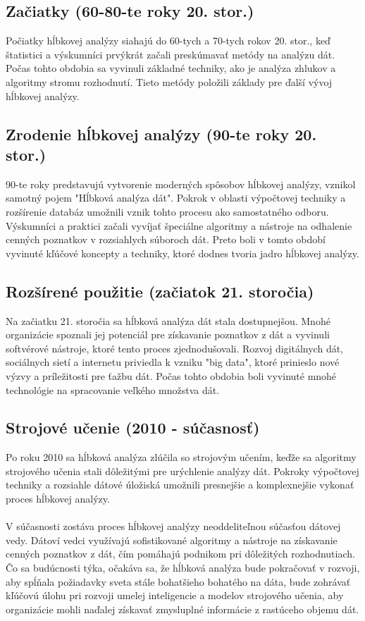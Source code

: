 \documentclass[10pt,twoside,slovak,a4paper]{article}
\begin{document}
\subsection{Začiatky (60-80-te roky 20. stor.)} 
Počiatky hĺbkovej analýzy siahajú do 60-tych a 70-tych rokov 20. stor., keď štatistici a výskumníci prvýkrát začali preskúmavať metódy na analýzu dát.
Počas tohto obdobia sa vyvinuli základné techniky, ako je analýza zhlukov a algoritmy stromu rozhodnutí. Tieto metódy položili základy pre ďalší vývoj hĺbkovej analýzy.

\subsection{Zrodenie hĺbkovej analýzy (90-te roky 20. stor.)} 
90-te roky predstavujú vytvorenie moderných spôsobov hĺbkovej analýzy, vznikol samotný pojem "Hĺbková analýza dát". Pokrok v oblasti výpočtovej techniky a rozšírenie databáz umožnili vznik tohto procesu ako samostatného odboru. Výskumníci a praktici začali vyvíjať špeciálne algoritmy a nástroje na odhalenie cenných poznatkov v rozsiahlych súboroch dát. Preto boli v tomto období vyvinuté kľúčové koncepty a techniky, ktoré dodnes tvoria jadro hĺbkovej analýzy.

\subsection{Rozšírené použitie (začiatok 21. storočia)} 
Na začiatku 21. storočia sa hĺbková analýza dát stala dostupnejšou. Mnohé organizácie spoznali jej potenciál pre získavanie poznatkov z dát a vyvinuli softvérové nástroje, ktoré tento proces zjednodušovali. Rozvoj digitálnych dát, sociálnych sietí a internetu priviedla k vzniku "big data", ktoré prinieslo nové výzvy a príležitosti pre ťažbu dát. Počas tohto obdobia boli vyvinuté mnohé technológie na spracovanie veľkého množstva dát.
\subsection{Strojové učenie (2010 - súčasnosť)}
Po roku 2010 sa hĺbková analýza zlúčila so strojovým učením, keďže sa algoritmy strojového učenia stali dôležitými pre urýchlenie analýzy dát. Pokroky výpočtovej techniky a rozsiahle dátové úložiská umožnili presnejšie a komplexnejšie vykonať proces hĺbkovej analýzy.
\\
\\
V súčasnosti zostáva proces hĺbkovej analýzy neoddeliteľnou súčasťou dátovej vedy. Dátoví vedci využívajú sofistikované algoritmy a nástroje na získavanie cenných poznatkov z dát, čím pomáhajú podnikom pri dôležitých rozhodnutiach. Čo sa budúcnosti týka, očakáva sa, že hĺbková analýza bude pokračovať v rozvoji, aby spĺňala požiadavky sveta stále bohatšieho bohatého na dáta, bude zohrávať kľúčovú úlohu pri rozvoji umelej inteligencie a modelov strojového učenia, aby organizácie mohli naďalej získavať zmysluplné informácie z rastúceho objemu dát.\cite{Majid:Evolution}
\end{document}
